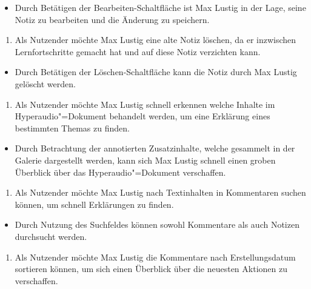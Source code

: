 \begin{itemize}[resume*]
\item[\Checkmark]
Durch Betätigen der \glqq Bearbeiten\grqq{}-Schaltfläche ist Max Lustig in der Lage, seine Notiz zu bearbeiten und die Änderung zu speichern.
\end{itemize}
\vspace{0.25cm}
\begin{enumerate}[resume*]
\item \label{US-Notiz-Loeschen-Eval} Als Nutzender möchte Max Lustig eine alte Notiz löschen, da er inzwischen Lernfortschritte gemacht hat und auf diese Notiz verzichten kann.
\end{enumerate}
\begin{itemize}[resume*]
\item[\Checkmark]
Durch Betätigen der \glqq Löschen\grqq{}-Schaltfläche kann die Notiz durch Max Lustig gelöscht werden.
\end{itemize}
\vspace{0.25cm}
\begin{enumerate}[resume*]
\item \label{US-Galerie-Eval} Als Nutzender möchte Max Lustig schnell erkennen welche Inhalte im Hyperaudio"=Dokument behandelt werden, um eine Erklärung eines bestimmten Themas zu finden.
\end{enumerate}
\begin{itemize}[resume*]
\item[\Checkmark]
Durch Betrachtung der annotierten Zusatzinhalte, welche gesammelt in der Galerie dargestellt werden, kann sich Max Lustig schnell einen groben Überblick über das Hyperaudio"=Dokument verschaffen.
\end{itemize}
\vspace{0.25cm}
\begin{enumerate}[resume*]
\item \label{US-Suche-Eval} Als Nutzender möchte Max Lustig nach Textinhalten in Kommentaren suchen können, um schnell Erklärungen zu finden.
\end{enumerate}
\begin{itemize}[resume*]
\item[\Checkmark]
Durch Nutzung des Suchfeldes können sowohl Kommentare als auch Notizen durchsucht werden.
\end{itemize}
\vspace{0.25cm}
\begin{enumerate}[resume*]
\item \label{US-Sortierung-Erstellungsdatum-Eval} Als Nutzender möchte Max Lustig die Kommentare nach Erstellungsdatum sortieren können, um sich einen Überblick über die neuesten Aktionen zu verschaffen.
\end{enumerate}

